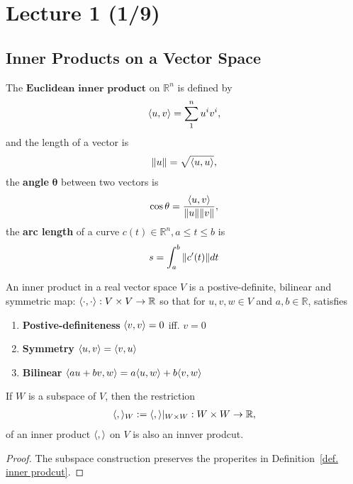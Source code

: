 
\section[Lecture 1--{Riemannian manifold}]{Lecture 1 (1/9)}

\subsection{Inner Products on a Vector Space}
The $\textbf{Euclidean inner product}$ on $\mathbb{R}^n$ is defined by
\begin{align}
    \langle u, v \rangle=\sum_{1}^{n}u^i v^i,
\end{align}
and the length of a vector is
\begin{align}
    \| u \|=\sqrt{\langle u, u \rangle},
\end{align}
the \textbf{angle} $\boldsymbol{\theta}$ between two vectors is
\begin{align}
    \cos \theta = \frac{\langle u, v \rangle}{\| u \|\| v \|},
\end{align}
the \textbf{arc length} of a curve $c(t) \in \mathbb{R}^n, a \leq t \leq b$ is 
\begin{align}
    s = \int_{a}^{b} \| c'(t) \| dt
\end{align}

\begin{definition}
    An inner product in a real vector space $V$ is a postive-definite,
    bilinear and symmetric map: $\langle \cdot, \cdot \rangle: 
    V \times V \rightarrow \mathbb{R}$ 
    so that for $u,v,w \in V$ and $a,b\in \mathbb{R}$, satisfies
    \begin{enumerate}[label= (\roman*)]
        \item \textbf{Postive-definiteness} $\langle v, v \rangle=0$ iff. $v=0$
        \item \textbf{Symmetry} $\langle u, v \rangle=\langle v, u \rangle$
        \item \textbf{Bilinear} $\langle au+bv, w \rangle=a\langle u, w \rangle+b\langle v, w \rangle$
    \end{enumerate}
\label{def. inner prodcut}
\end{definition}

\begin{proposition}
    If $W$ is a subspace of $V$, then the restriction
    \begin{align}
        \langle ,  \rangle_W:=\langle ,  \rangle|_{W\times W}: W \times W \rightarrow \mathbb{R},
    \end{align}
    of an inner product
    $\langle ,  \rangle$ on $V$ is also an innver prodcut.
\end{proposition}
\begin{proof}
    The subspace construction preserves the properites 
    in Definition~\ref{def. inner prodcut}.
\end{proof}

